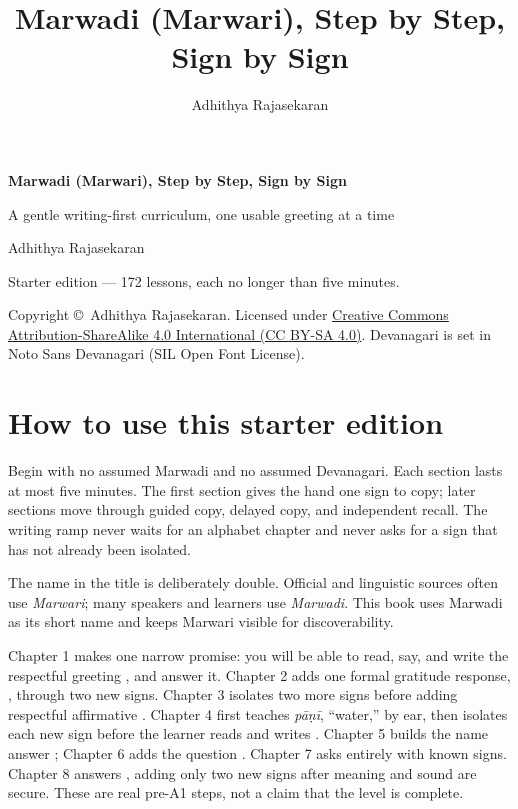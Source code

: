 \documentclass[11pt,twoside]{book}
\title{\Huge Marwadi (Marwari), Step by Step, Sign by Sign}
\author{Adhithya Rajasekaran}
\date{}
\begin{document}
\frontmatter

\begin{titlepage}
  \centering
  \vspace*{3cm}
  {\Huge\bfseries Marwadi (Marwari), Step by Step, Sign by Sign\par}
  \vspace{1cm}
  {\Large A gentle writing-first curriculum, one usable greeting at a time\par}
  \vspace{1.5cm}
  {\large Adhithya Rajasekaran\par}
  \vfill
  {\large Starter edition --- 172 lessons, each no longer than five minutes.\par}
  \vspace{2cm}
  {\normalsize Copyright \copyright\ Adhithya Rajasekaran. Licensed under
    \href{https://creativecommons.org/licenses/by-sa/4.0/}%
    {Creative Commons Attribution-ShareAlike 4.0 International (CC BY-SA 4.0)}.
    Devanagari is set in Noto Sans Devanagari (SIL Open Font License).\par}
\end{titlepage}

\chapter*{How to use this starter edition}

Begin with no assumed Marwadi and no assumed Devanagari. Each section lasts at
most five minutes. The first section gives the hand one sign to copy; later
sections move through guided copy, delayed copy, and independent recall. The
writing ramp never waits for an alphabet chapter and never asks for a sign that
has not already been isolated.

The name in the title is deliberately double. Official and linguistic sources
often use \emph{Marwari}; many speakers and learners use \emph{Marwadi}. This
book uses Marwadi as its short name and keeps Marwari visible for discoverability.

Chapter 1 makes one narrow promise: you will be able to read, say, and write the
respectful greeting , and answer it. Chapter 2 adds one formal
gratitude response, , through two new signs. Chapter 3 isolates two
more signs before adding respectful affirmative . Chapter 4 first
teaches \emph{pāṇī}, ``water,'' by ear, then isolates each new sign before the
learner reads and writes . Chapter 5 builds the name answer
; Chapter 6 adds the question
. Chapter 7 asks  entirely with known
signs. Chapter 8 answers , adding only two new signs after
meaning and sound are secure.
These are real pre-A1 steps, not a claim that the level is complete.
\end{document}
